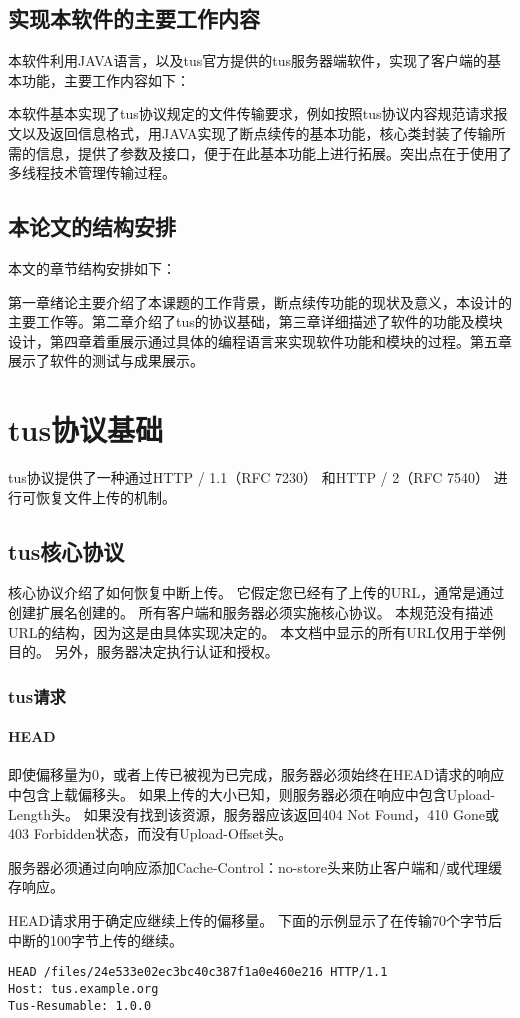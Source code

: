 \documentclass[bachelor]{thesis-uestc}
\begin{document}
\section{实现本软件的主要工作内容}
本软件利用JAVA语言，以及tus官方提供的tus服务器端软件，实现了客户端的基本功能，主要工作内容如下：
\par 本软件基本实现了tus协议规定的文件传输要求，例如按照tus协议内容规范请求报文以及返回信息格式，用JAVA实现了断点续传的基本功能，核心类封装了传输所需的信息，提供了参数及接口，便于在此基本功能上进行拓展。突出点在于使用了多线程技术管理传输过程。

\section{本论文的结构安排}
本文的章节结构安排如下：
\par 第一章绪论主要介绍了本课题的工作背景，断点续传功能的现状及意义，本设计的主要工作等。第二章介绍了tus的协议基础，第三章详细描述了软件的功能及模块设计，第四章着重展示通过具体的编程语言来实现软件功能和模块的过程。第五章展示了软件的测试与成果展示。

\chapter{tus协议基础}
tus协议提供了一种通过HTTP / 1.1（RFC 7230） 和HTTP / 2（RFC 7540） 进行可恢复文件上传的机制。

\section{tus核心协议}
核心协议介绍了如何恢复中断上传。 它假定您已经有了上传的URL，通常是通过创建扩展名创建的。
所有客户端和服务器必须实施核心协议。
本规范没有描述URL的结构，因为这是由具体实现决定的。 本文档中显示的所有URL仅用于举例目的。
另外，服务器决定执行认证和授权。

\subsection{tus请求}
\subsubsection{HEAD}
即使偏移量为0，或者上传已被视为已完成，服务器必须始终在HEAD请求的响应中包含上载偏移头。 如果上传的大小已知，则服务器必须在响应中包含Upload-Length头。 如果没有找到该资源，服务器应该返回404 Not Found，410 Gone或403 Forbidden状态，而没有Upload-Offset头。
\par 服务器必须通过向响应添加Cache-Control：no-store头来防止客户端和/或代理缓存响应。
\par HEAD请求用于确定应继续上传的偏移量。
下面的示例显示了在传输70个字节后中断的100字节上传的继续。
\begin{lstlisting}[title=Request]
HEAD /files/24e533e02ec3bc40c387f1a0e460e216 HTTP/1.1
Host: tus.example.org
Tus-Resumable: 1.0.0
\end{lstlisting}
\end{document}
